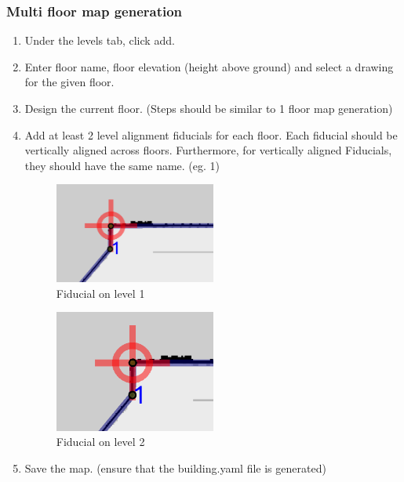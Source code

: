 \documentclass[11pt]{article}
\begin{document}
\subsubsection{Multi floor map generation}
\begin{enumerate}
 \item {Under the levels tab, click add.}
 \item {Enter floor name, floor elevation (height above ground) and select a drawing for the given floor.}
 \item {Design the current floor. (Steps should be similar to 1 floor map generation)}
 \item {
       Add at least 2 level alignment  fiducials for each floor. Each fiducial should be vertically aligned across floors.
       Furthermore, for vertically aligned Fiducials, they should have the same name. (eg. 1)
       \begin{figure}[H]
        \centering
        \includegraphics[width=0.5\textwidth]{images/Level1Fucd}
        \caption{Fiducial on level 1}
       \end{figure}
       
       \begin{figure}[H]
        \centering
        \includegraphics[width=0.5\textwidth]{images/Level2Fucd}
        \caption{Fiducial on level 2}
       \end{figure}
       }
 \item {Save the map. (ensure that the building.yaml file is generated)}
\end{enumerate}
\end{document}
